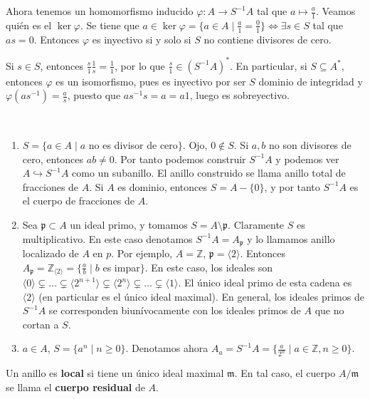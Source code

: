 \documentclass[ACGA.tex]{subfiles}
\begin{document}
Ahora tenemos un homomorfismo inducido $\varphi: A\to S^{-1}A$ tal que $a\mapsto \frac{a}{1}$. Veamos quién es el $\ker{\varphi}$. Se tiene que $a\in\ker{\varphi}=\{a\in A\mid \frac{a}{1}=\frac{0}{1}\}\Leftrightarrow \exists s\in S$ tal que $as=0$. Entonces $\varphi$ es inyectivo si y solo si $S$ no contiene divisores de cero.

\begin{observaciones}
Si $s\in S$, entonces $\frac{s}{1}\frac{1}{s}=\frac{1}{1}$, por lo que $\frac{s}{1}\in (S^{-1}A)^*$. En particular, si $S\subseteq A^*$, entonces $\varphi$ es un isomorfismo, pues es inyectivo por ser $S$ dominio de integridad y $\varphi(a s^{-1})=\frac{a}{s}$, puesto que $a s^{-1}s=a=a1$, luego es sobreyectivo.
\end{observaciones}

\begin{ej}\
\begin{enumerate}
\item $S=\{a\in A\mid a$ no es divisor de cero$\}$. Ojo, $0\notin S$. Si $a,b$ no son divisores de cero, entonces $ab\neq 0$. Por tanto podemos construir $S^{-1}A$ y podemos ver $A\hookrightarrow S^{-1}A$ como un subanillo. El anillo construido se llama anillo total de fracciones de $A$.  Si $A$ es dominio, entonces $S=A-\{0\}$, y por tanto $S^{-1}A$ es el cuerpo de fracciones de $A$.
\item Sea $\mathfrak{p}\subset A$ un ideal primo, y tomamos $S=A\setminus\mathfrak{p}$. Claramente $S$ es multiplicativo. En este caso denotamos $S^{-1}A=A_\mathfrak{p}$ y lo llamamos anillo localizado de $A$ en $p$. Por ejemplo, $A=\mathbb{Z}$, $\mathfrak{p}=\langle 2\rangle$. Entonces $A_\mathfrak{p}=\mathbb{Z}_{\langle 2\rangle}=\{\frac{a}{b}\mid b$ es impar$\}$. En este caso, los ideales son $\langle 0\rangle\subsetneq\dots\subsetneq\langle 2^{n+1}\rangle\subsetneq\langle 2^n\rangle\subsetneq\dots\subsetneq\langle 1\rangle$. El único ideal primo de esta cadena es $\langle 2\rangle$ (en particular es el único ideal maximal). En general, los ideales primos de $S^{-1}A$  se corresponden biunívocamente con los ideales primos de $A$ que no cortan a $S$. 
\item $a\in A$, $S=\{a^n\mid n\geq 0\}$. Denotamos ahora $A_a=S^{-1}A=\{\frac{a}{2^n}\mid a\in\mathbb{Z},n\geq 0\}$.
\end{enumerate}

\end{ej}

\begin{defi}
Un anillo es {\bf local } si tiene un único ideal maximal $\mathfrak{m}$. En tal caso, el cuerpo $A/\mathfrak{m}$ se llama el {\bf cuerpo residual } de $A$. 
\end{defi}
\end{document}
